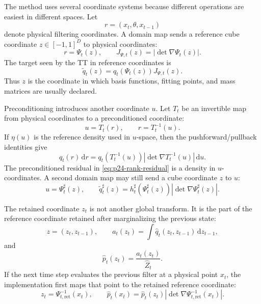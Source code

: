 \documentclass[11pt]{article}
\numberwithin{equation}{section}
\newcommand{\dd}{\,\mathrm d}
\begin{document}
The method uses several coordinate systems because different operations are
easiest in different spaces.  Let
\begin{equation}
    r=(x_t,\theta,x_{t-1})
    \label{eq:p24-coord-physical}
\end{equation}
denote physical filtering coordinates.  A domain map sends a reference cube
coordinate \(z\in[-1,1]^D\) to physical coordinates:
\begin{equation}
    r=\Psi_t(z),
    \qquad
    J_{\Psi,t}(z)=\left|\det\nabla\Psi_t(z)\right|.
    \label{eq:p24-coord-domain}
\end{equation}
The target seen by the TT in reference coordinates is
\begin{equation}
    \widetilde q_t(z)
    =
    q_t(\Psi_t(z))J_{\Psi,t}(z).
    \label{eq:p24-coord-reference-density}
\end{equation}
Thus \(z\) is the coordinate in which basis functions, fitting points, and
mass matrices are usually declared.

Preconditioning introduces another coordinate \(u\).  Let \(T_t\) be an
invertible map from physical coordinates to a preconditioned coordinate:
\begin{equation}
    u=T_t(r),
    \qquad
    r=T_t^{-1}(u).
    \label{eq:p24-coord-preconditioner}
\end{equation}
If \(\eta(u)\) is the reference density used in \(u\)-space, then the
pushforward/pullback identities give
\begin{equation}
    q_t(r)\dd r
    =
    q_t(T_t^{-1}(u))
    \left|\det\nabla T_t^{-1}(u)\right|\dd u.
    \label{eq:p24-coord-density-u}
\end{equation}
The preconditioned residual in \eqref{eq:p24-rank-residual} is a density in
\(u\)-coordinates.  A second domain map may still send a cube coordinate \(z\)
to \(u\):
\begin{equation}
    u=\Psi_t^\sharp(z),
    \qquad
    \widetilde q_t^\sharp(z)
    =
    h_t^\sharp(\Psi_t^\sharp(z))
    \left|\det\nabla\Psi_t^\sharp(z)\right|.
    \label{eq:p24-coord-preconditioned-reference}
\end{equation}

The retained coordinate \(z_t\) is not another global transform.  It is the
part of the reference coordinate retained after marginalizing the previous
state:
\begin{equation}
    z=(z_t,z_{t-1}),
    \qquad
    a_t(z_t)=\int \widehat q_t(z_t,z_{t-1})\dd z_{t-1},
    \label{eq:p24-coord-retained}
\end{equation}
and
\begin{equation}
    \widehat p_t(z_t)=\frac{a_t(z_t)}{\widehat Z_t}.
    \label{eq:p24-coord-retained-filter}
\end{equation}
If the next time step evaluates the previous filter at a physical point
\(x_t\), the implementation first maps that point to the retained reference
coordinate:
\begin{equation}
    z_t=\Psi_{t,\mathrm{ret}}^{-1}(x_t),
    \qquad
    \widehat p_t(x_t)=
    \widehat p_t(z_t)
    \left|\det\nabla\Psi_{t,\mathrm{ret}}^{-1}(x_t)\right|.
    \label{eq:p24-coord-retained-physical}
\end{equation}
\end{document}
